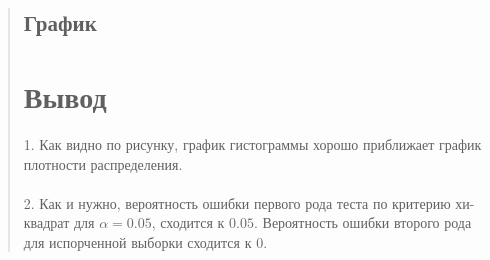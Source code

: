\documentclass{article}
\begin{document}
\begin{quote}
\subsection{График}

\section{Вывод}
	1. Как видно по рисунку, график гистограммы хорошо приближает график плотности распределения. \\ \\
        2. Как и нужно, вероятность ошибки первого рода теста по критерию хи-квадрат для $\alpha = 0.05$, сходится к $0.05$. Вероятность ошибки второго рода для испорченной выборки сходится к $0$.
\end{quote}
\end{document}
